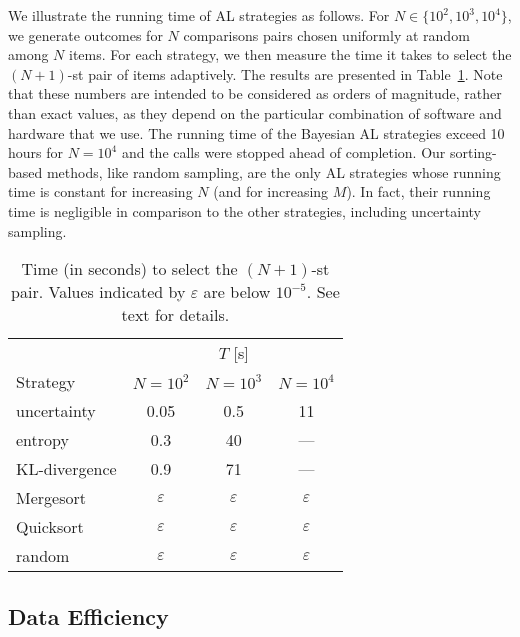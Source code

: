 We illustrate the running time of AL strategies as follows.
For $N \in \{10^2, 10^3, 10^4 \}$, we generate outcomes for $N$ comparisons pairs chosen uniformly at random among $N$ items.
For each strategy, we then measure the time it takes to select the $(N\!+\!1)$-st pair of items adaptively.
The results are presented in Table~\ref{rs:tab:runningtime}.
Note that these numbers are intended to be considered as orders of magnitude, rather than exact values, as they depend on the particular combination of software and hardware that we use.
The running time of the Bayesian AL strategies exceed \num{10} hours for $N = 10^4$ and the calls were stopped ahead of completion.
Our sorting-based methods, like random sampling, are the only AL strategies whose running time is constant for increasing $N$ (and for increasing $M$).
In fact, their running time is negligible in comparison to the other strategies, including uncertainty sampling.

\begin{table}[t]
  \caption{
Time (in seconds) to select the $(N\!+\!1)$-st pair.
Values indicated by $\varepsilon$ are below $10^{-5}$.
See text for details.
}
  \label{rs:tab:runningtime}
  \centering
  \begin{tabular}{l ccc}
    \toprule
                  & \multicolumn{3}{c}{$T$ [s]} \\
                    \cmidrule(l){2-4}
    Strategy      & $N = 10^2$      & $N = 10^3$       & $N = 10^4$ \\
    \midrule
    uncertainty   & \num{0.05}      & \num{0.5}        & \num{11}      \\
    entropy       & \num{0.3}       & \num{40}         & ---           \\
    KL-divergence & \num{0.9}       & \num{71}         & ---           \\
    Mergesort     & $\varepsilon$   & $\varepsilon$    & $\varepsilon$ \\
    Quicksort     & $\varepsilon$   & $\varepsilon$    & $\varepsilon$ \\
    random        & $\varepsilon$   & $\varepsilon$    & $\varepsilon$ \\
    \bottomrule
  \end{tabular}
\end{table}


\subsection{Data Efficiency}

